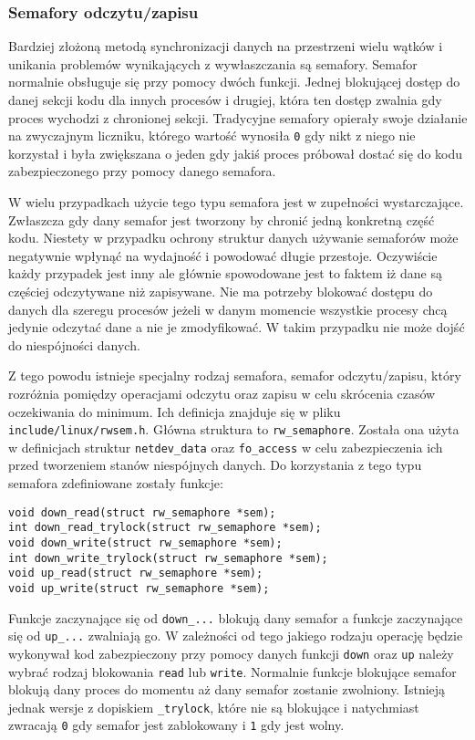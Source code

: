 \documentclass[10pt]{article}
\begin{document}
\subsubsection{Semafory odczytu/zapisu}

Bardziej złożoną metodą synchronizacji danych na przestrzeni wielu
wątków i unikania problemów wynikających z wywłaszczania są semafory.
Semafor normalnie obsługuje się przy pomocy dwóch funkcji. Jednej
blokującej dostęp do danej sekcji kodu dla innych procesów i drugiej,
która ten dostęp zwalnia gdy proces wychodzi z chronionej sekcji.
Tradycyjne semafory opierały swoje działanie na zwyczajnym liczniku,
którego wartość wynosiła \texttt{0} gdy nikt z niego nie korzystał i
była zwiększana o jeden gdy jakiś proces próbował dostać się do kodu
zabezpieczonego przy pomocy danego semafora.

W wielu przypadkach użycie tego typu semafora jest w zupełności
wystarczające. Zwłaszcza gdy dany semafor jest tworzony by chronić jedną
konkretną część kodu. Niestety w przypadku ochrony struktur danych
używanie semaforów może negatywnie wpłynąć na wydajność i powodować
długie przestoje. Oczywiście każdy przypadek jest inny ale głównie
spowodowane jest to faktem iż dane są częściej odczytywane niż
zapisywane. Nie ma potrzeby blokować dostępu do danych dla szeregu
procesów jeżeli w danym momencie wszystkie procesy chcą jedynie odczytać
dane a nie je zmodyfikować. W takim przypadku nie może dojść do
niespójności danych.

Z tego powodu istnieje specjalny rodzaj semafora, semafor
odczytu/zapisu, który rozróżnia pomiędzy operacjami odczytu oraz zapisu
w celu skrócenia czasów oczekiwania do minimum. Ich definicja znajduje
się w pliku \texttt{include/linux/rwsem.h}. Główna struktura to
\texttt{rw\_semaphore}. Została ona użyta w definicjach struktur
\texttt{netdev\_data} oraz \texttt{fo\_access} w celu zabezpieczenia ich
przed tworzeniem stanów niespójnych danych. Do korzystania z tego typu
semafora zdefiniowane zostały funkcje:

\begin{verbatim}
void down_read(struct rw_semaphore *sem);
int down_read_trylock(struct rw_semaphore *sem);
void down_write(struct rw_semaphore *sem);
int down_write_trylock(struct rw_semaphore *sem);
void up_read(struct rw_semaphore *sem);
void up_write(struct rw_semaphore *sem);
\end{verbatim}

Funkcje zaczynające się od \texttt{down\_...} blokują dany semafor a
funkcje zaczynające się od \texttt{up\_...} zwalniają go. W zależności
od tego jakiego rodzaju operację będzie wykonywał kod zabezpieczony przy
pomocy danych funkcji \texttt{down} oraz \texttt{up} należy wybrać
rodzaj blokowania \texttt{read} lub \texttt{write}. Normalnie funkcje
blokujące semafor blokują dany proces do momentu aż dany semafor
zostanie zwolniony. Istnieją jednak wersje z dopiskiem
\texttt{\_trylock}, które nie są blokujące i natychmiast zwracają
\texttt{0} gdy semafor jest zablokowany i \texttt{1} gdy jest wolny.
\end{document}
